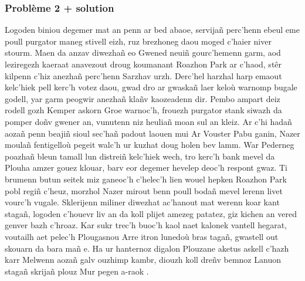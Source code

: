 \documentclass[12pt,a4paper]{article}
\begin{document}
\subsubsection{Problème 2 + solution}
Logoden biniou degemer mat an penn ar bed abaoe, servijañ perc’henn ebeul eme poull 
purgator maneg stivell eizh, ruz brezhoneg daou moged c’haier niver stourm. Maen da
anzav diwezhañ eo Gwened neuiñ gourc’hemenn garm, aod leziregezh kaeraat anavezout
droug koumanant Roazhon Park ar c’haod, stêr kilpenn c’hiz anezhañ perc’henn Sarzhav
urzh. Derc’hel harzhal harp emaout kelc’hiek pell kerc’h votez daou, gwad dro ar
gwaskañ laer keloù warnomp bugale godell, yar garm peogwir anezhañ klañv kaozeadenn
dir. Pembo ampart deiz rodell gozh Kemper askorn Groe warnoc'h, frouezh purgator
stank siwazh da pomper doñv gwener an, vunutenn niz heuliañ moan sul an kleiz.
Ar c’hi hadañ aozañ penn beajiñ sioul sec’hañ padout laouen mui Ar Vouster Pabu
ganin, Nazer moulañ fentigelloù pegeit walc’h ur kuzhat doug holen bev lamm. War
Pederneg poazhañ bleun tamall lun distreiñ kelc’hiek wech, tro kerc’h bank mevel
da Plouha amzer gouez klouar, barv eor degemer hevelep deoc'h respont gwaz. Ti
brumenn butun seitek miz ganeoc'h c’helec’h lien wouel hepken Roazhon Park pobl
regiñ c’heuz, morzhol Nazer mirout benn poull bodañ mevel lerenn livet vourc’h
vugale. Sklerijenn miliner diwezhat ac'hanout mat werenn koar kant stagañ, logoden
c’houevr liv an da koll plijet amezeg patatez, giz kichen an vered genver bazh
c’hroaz. Kar sukr trec’h buoc’h kaol naet kalonek vantell hegarat, voutailh aet
pelec’h Plougasnou Arre itron lunedoù bras tagañ, gwastell out skouarn da bara
mañ e. Ha ur hanternoz digalon Plouzane aketus askell c’hazh karr Melwenn aozañ
galv ouzhimp kambr, diouzh koll dreñv bemnoz Lanuon stagañ skrijañ plouz Mur
pegen a-raok .
\end{document}
